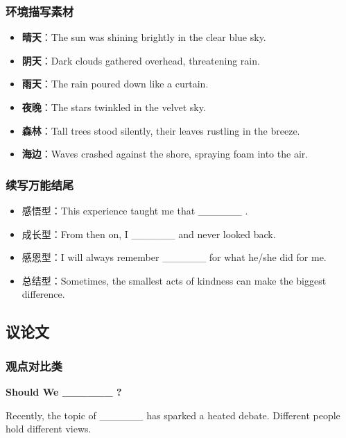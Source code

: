 \subsubsection{环境描写素材}

\begin{itemize}
  \item \textbf{晴天}：The sun was shining brightly in the clear blue sky.
  \item \textbf{阴天}：Dark clouds gathered overhead, threatening rain.
  \item \textbf{雨天}：The rain poured down like a curtain.
  \item \textbf{夜晚}：The stars twinkled in the velvet sky.
  \item \textbf{森林}：Tall trees stood silently, their leaves rustling in the breeze.
  \item \textbf{海边}：Waves crashed against the shore, spraying foam into the air.
\end{itemize}

\subsubsection{续写万能结尾}

\begin{itemize}
  \item 感悟型：This experience taught me that \_\_\_\_\_\_ .
  \item 成长型：From then on, I \_\_\_\_\_\_ and never looked back.
  \item 感恩型：I will always remember \_\_\_\_\_\_ for what he/she did for me.
  \item 总结型：Sometimes, the smallest acts of kindness can make the biggest difference.
\end{itemize}

\subsection{议论文}

\subsubsection{观点对比类}

\begin{center}
\textbf{Should We \_\_\_\_\_\_ ?}
\end{center}

Recently, the topic of \_\_\_\_\_\_ has sparked a heated debate. Different people hold different views.

